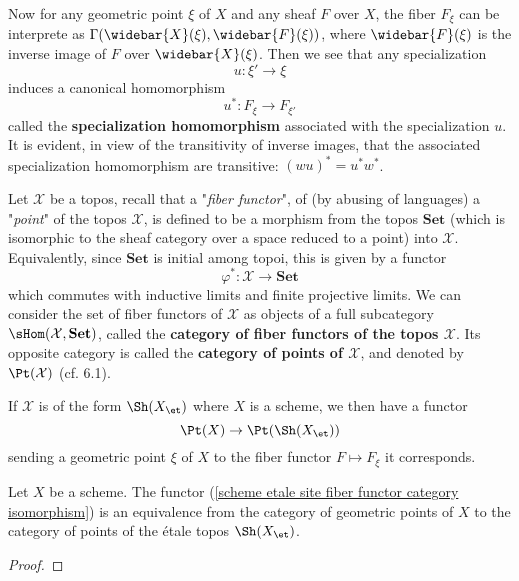 Now for any geometric point $\xi$ of $X$ and any sheaf $F$ over $X$, the fiber $F_\xi$ can be interprete as $\Gamma(\widebar{X}(\xi),\widebar{F}(\xi))$, where $\widebar{F}(\xi)$ is the inverse image of $F$ over $\widebar{X}(\xi)$. Then we see that any specialization
\[u:\xi'\to\xi\]
induces a canonical homomorphism
\[u^*:F_\xi\to F_{\xi'}\]
called the \textbf{specialization homomorphism} associated with the specialization $u$. It is evident, in view of the transitivity of inverse images, that the associated specialization homomorphism are transitive: $(wu)^*=u^*w^*$.\par
Let $\mathcal{X}$ be a topos, recall that a "\textit{fiber functor}", of (by abusing of languages) a "\textit{point}" of the topos $\mathcal{X}$, is defined to be a morphism from the topos $\mathbf{Set}$ (which is isomorphic to the sheaf category over a space reduced to a point) into $\mathcal{X}$. Equivalently, since $\mathbf{Set}$ is initial among topoi, this is given by a functor
\[\varphi^*:\mathcal{X}\to\mathbf{Set}\]
which commutes with inductive limits and finite projective limits. We can consider the set of fiber functors of $\mathcal{X}$ as objects of a full subcategory $\sHom(\mathcal{X},\mathbf{Set})$, called the \textbf{category of fiber functors of the topos $\mathcal{X}$}. Its opposite category is called the \textbf{category of points of $\mathcal{X}$}, and denoted by $\Pt(\mathcal{X})$ (cf. \cite{SGA4-1}  6.1).\par
If $\mathcal{X}$ is of the form $\Sh(X_\et)$ where $X$ is a scheme, we then have a functor
\begin{equation}\label{scheme etale site fiber functor category isomorphism-1}
\Pt(X)\to\Pt(\Sh(X_\et))
\end{equation}
sending a geometric point $\xi$ of $X$ to the fiber functor $F\mapsto F_\xi$ it corresponds.

\begin{theorem}\label{scheme etale site fiber functor category isomorphism}
Let $X$ be a scheme. The functor (\ref{scheme etale site fiber functor category isomorphism}) is an equivalence from the category of geometric points of $X$ to the category of points of the \'etale topos $\Sh(X_\et)$.
\end{theorem}
\begin{proof}

\end{proof}

